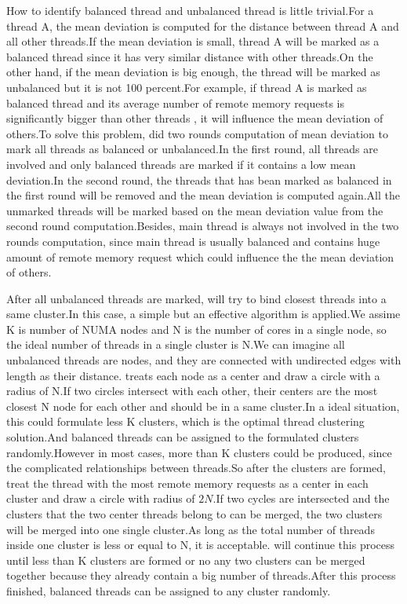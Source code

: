 How to identify balanced thread and unbalanced thread is little trivial.For a thread A, the mean deviation is computed for the distance between thread A and all other threads.If the mean deviation is small, thread A will be marked as a balanced thread since it has very similar distance with other threads.On the other hand, if the mean deviation is big enough, the thread will be marked as unbalanced but it is not 100 percent.For example, if thread A is marked as balanced thread and its average number of remote memory requests is significantly bigger than other threads , it will influence the mean deviation of others.To solve this problem, \NP{} did two rounds computation of mean deviation to mark all threads as balanced or unbalanced.In the first round, all threads are involved and only balanced threads are marked if it contains a low mean deviation.In the second round, the threads that has bean marked as balanced in the first round will be removed and the mean deviation is computed again.All the unmarked threads will be marked based on the mean deviation value from the second round computation.Besides, main thread is always not involved in the two rounds computation, since main thread is usually balanced and contains huge amount of remote memory request which could influence the the mean deviation of others.

After all unbalanced threads are marked, \NP{} will try to bind closest threads into a same cluster.In this case, a simple but an effective algorithm is applied.We assime K is number of NUMA nodes and N is the number of cores in a single node, so the ideal number of threads in a single cluster is N.We can imagine all unbalanced threads are nodes, and they are connected with undirected edges with length as their distance.\NP{} treats each node as a center and draw a circle with a radius of N.If two circles intersect with each other, their centers are the most closest N node for each other and should be in a same cluster.In a ideal situation, this could formulate less K clusters, which is the optimal thread clustering solution.And balanced threads can be assigned to the formulated clusters randomly.However in most cases, more than K clusters could be produced, since the complicated relationships between threads.So after the clusters are formed, \NP{} treat the thread with the most remote memory requests as a center in each cluster and draw a circle with radius of $2N$.If two cycles are intersected and the clusters that the two center threads belong to can be merged, the two clusters will be merged into one single cluster.As long as the total number of threads inside one cluster is less or equal to N, it is acceptable. \NP{} will continue this process until less than K clusters are formed or no any two clusters can be merged together because they already contain a big number of threads.After this process finished, balanced threads can be assigned to any cluster randomly. 
